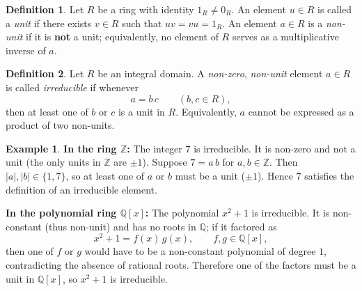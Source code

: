 \documentclass[12pt]{article}
\theoremstyle{definition} %
\newtheorem{definition}{Definition}
\newtheorem{example}{Example}
\theoremstyle{plain} %
\begin{document}
  \begin{definition}
    Let $R$ be a ring with identity $1_R\neq 0_R$.  
    An element $u\in R$ is called a \emph{unit} if there exists $v\in R$ such that $uv=vu=1_R$.  
    An element $a\in R$ is a \emph{non-unit} if it is \textbf{not} a unit; equivalently, no element of $R$ serves as a multiplicative inverse of $a$.
\end{definition}
\begin{definition}
  Let $R$ be an integral domain.  
  A \emph{non-zero}, \emph{non-unit} element $a\in R$ is called \emph{irreducible} if whenever
  \[
      a = b\,c \qquad(b,c\in R),
  \]
  then at least one of $b$ or $c$ is a unit in $R$.  Equivalently, $a$ cannot be expressed as a product of two non-units.
\end{definition}
\begin{example}
  \textbf{In the ring $\mathbb{Z}$:}  
  The integer $7$ is irreducible.  
  It is non-zero and not a unit (the only units in $\mathbb{Z}$ are $\pm1$).  
  Suppose $7 = a\,b$ for $a,b\in\mathbb{Z}$.  
  Then $|a|,|b| \in \{1,7\}$, so at least one of $a$ or $b$ must be a unit ($\pm1$).  
  Hence $7$ satisfies the definition of an irreducible element.

  \medskip
  \textbf{In the polynomial ring $\mathbb{Q}[x]$:}  
  The polynomial $x^2 + 1$ is irreducible.  
  It is non-constant (thus non-unit) and has no roots in $\mathbb{Q}$; if it factored as
  \[
      x^2 + 1 = f(x)\,g(x), \qquad f,g\in\mathbb{Q}[x],
  \]
  then one of $f$ or $g$ would have to be a non-constant polynomial of degree $1$, contradicting the absence of rational roots.  
  Therefore one of the factors must be a unit in $\mathbb{Q}[x]$, so $x^2+1$ is irreducible.
\end{example}
\end{document}
